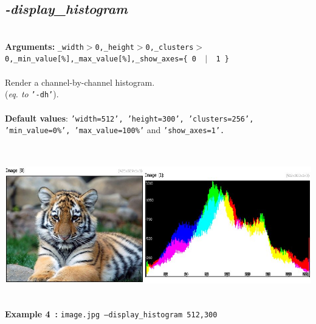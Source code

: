 \documentclass[a4paper,11pt,twoside]{book}
\begin{document}
\subsection{\emph{-display\_histogram} }\vspace*{-0.5em}
~\\\textbf{Arguments: } 
{\small \texttt{\_width$>$0,\_height$>$0,\_clusters$>$0,\_min\_value[\%],\_max\_value[\%],\_show\_axes=\{ 0 ~$|$~ 1 \}}}\\~\\
Render a channel-by-channel histogram.
~\\(\emph{eq. to} {\small \texttt{'-dh'}}).
~\\~\\\textbf{Default values}: {\small \texttt{'width=512', 'height=300', 'clusters=256', 'min\_value=0\%', 'max\_value=100\%'} and \texttt{'show\_axes=1'.}}
\begin{center}\includegraphics[keepaspectratio=true,height=7cm,width=\textwidth]{img/gmic_def4.jpg}\\
{\footnotesize \textbf{Example 4~:} \texttt{image.jpg --display\_histogram 512,300}}
\end{center}
\end{document}
